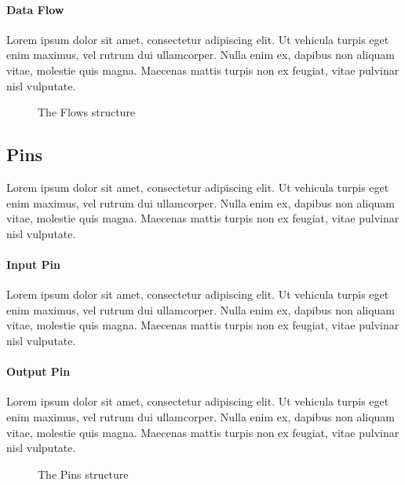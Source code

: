 \paragraph{Data Flow}\label{par:data_flow}

Lorem ipsum dolor sit amet, consectetur adipiscing elit. Ut vehicula turpis eget enim maximus, vel rutrum dui ullamcorper. Nulla enim ex, dapibus non aliquam vitae, molestie quis magna. Maecenas mattis turpis non ex feugiat, vitae pulvinar nisl vulputate.

\begin{figure}[!ht]
	\centering
	
	\caption{The Flows structure}
	\label{fig:flows}
\end{figure}

\subsection{Pins}\label{ssec:pins}

Lorem ipsum dolor sit amet, consectetur adipiscing elit. Ut vehicula turpis eget enim maximus, vel rutrum dui ullamcorper. Nulla enim ex, dapibus non aliquam vitae, molestie quis magna. Maecenas mattis turpis non ex feugiat, vitae pulvinar nisl vulputate.

\paragraph{Input Pin}

Lorem ipsum dolor sit amet, consectetur adipiscing elit. Ut vehicula turpis eget enim maximus, vel rutrum dui ullamcorper. Nulla enim ex, dapibus non aliquam vitae, molestie quis magna. Maecenas mattis turpis non ex feugiat, vitae pulvinar nisl vulputate.

\paragraph{Output Pin}

Lorem ipsum dolor sit amet, consectetur adipiscing elit. Ut vehicula turpis eget enim maximus, vel rutrum dui ullamcorper. Nulla enim ex, dapibus non aliquam vitae, molestie quis magna. Maecenas mattis turpis non ex feugiat, vitae pulvinar nisl vulputate.

\begin{figure}[!ht]
\centering

\caption{The Pins structure}
\label{fig:pins}
\end{figure}


